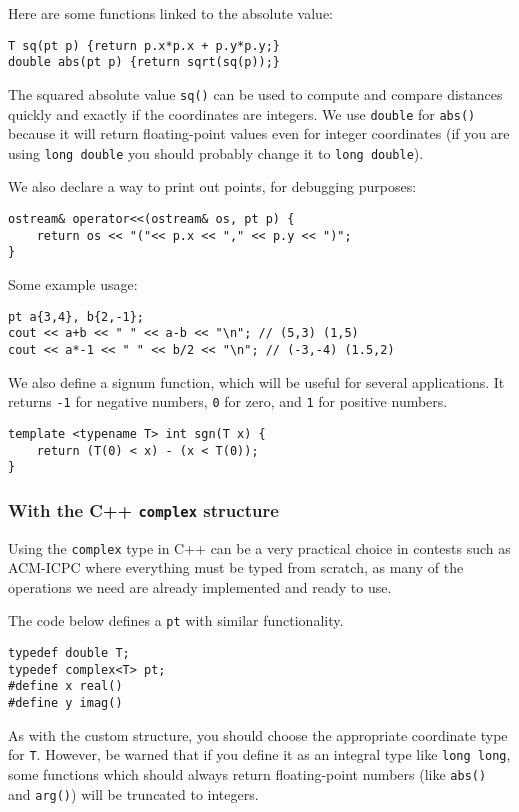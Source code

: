 Here are some functions linked to the absolute value:
\begin{lstlisting}
T sq(pt p) {return p.x*p.x + p.y*p.y;}
double abs(pt p) {return sqrt(sq(p));}
\end{lstlisting}
The squared absolute value \lstinline|sq()| can be used to compute and compare distances quickly and exactly if the coordinates are integers. We use \lstinline|double| for \lstinline|abs()| because it will return floating-point values even for integer coordinates (if you are using \lstinline|long double| you should probably change it to \lstinline|long double|).

We also declare a way to print out points, for debugging purposes:
\begin{lstlisting}
ostream& operator<<(ostream& os, pt p) {
    return os << "("<< p.x << "," << p.y << ")";
}
\end{lstlisting}

Some example usage:
\begin{lstlisting}
pt a{3,4}, b{2,-1};
cout << a+b << " " << a-b << "\n"; // (5,3) (1,5)
cout << a*-1 << " " << b/2 << "\n"; // (-3,-4) (1.5,2)
\end{lstlisting}

We also define a signum function, which will be useful for several applications. It returns \lstinline|-1| for negative numbers, \lstinline|0| for zero, and \lstinline|1| for positive numbers.
\begin{lstlisting}
template <typename T> int sgn(T x) {
    return (T(0) < x) - (x < T(0));
}
\end{lstlisting}

\subsubsection{With the C++ \lstinline|complex| structure}
Using the \lstinline|complex| type in C++ can be a very practical choice in contests such as ACM-ICPC where everything must be typed from scratch, as many of the operations we need are already implemented and ready to use.

The code below defines a \lstinline|pt| with similar functionality.
\begin{lstlisting}
typedef double T;
typedef complex<T> pt;
#define x real()
#define y imag()
\end{lstlisting}

\begin{warning}
As with the custom structure, you should choose the appropriate coordinate type for \lstinline|T|. However, be warned that if you define it as an integral type like \lstinline|long long|, some functions which should always return floating-point numbers (like \lstinline|abs()| and \lstinline|arg()|) will be truncated to integers.
\end{warning}

